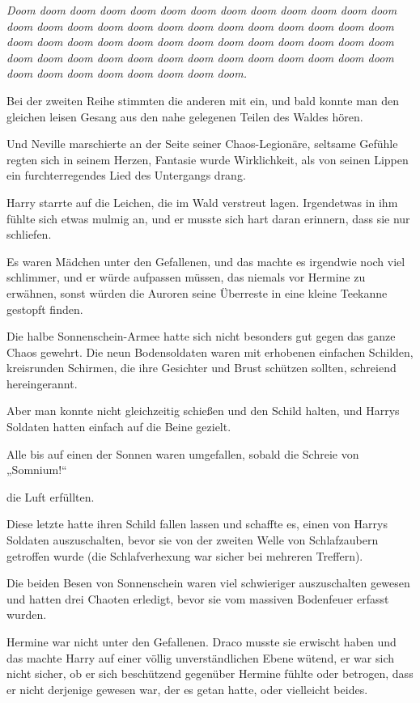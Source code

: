 {\emph{Doom doom doom doom doom doom doom doom doom doom doom doom doom doom doom doom doom doom doom doom doom doom doom doom doom doom doom doom doom doom doom doom doom doom doom doom doom doom doom doom doom doom doom doom doom doom doom doom doom doom doom doom doom doom doom doom doom doom doom doom.}

Bei der zweiten Reihe stimmten die anderen mit ein, und bald konnte man den gleichen leisen Gesang aus den nahe gelegenen Teilen des Waldes hören.

Und Neville marschierte an der Seite seiner Chaos-Legionäre, seltsame Gefühle regten sich in seinem Herzen, Fantasie wurde Wirklichkeit, als von seinen Lippen ein furchterregendes Lied des Untergangs drang.

Harry starrte auf die Leichen, die im Wald verstreut lagen. Irgendetwas in ihm fühlte sich etwas mulmig an, und er musste sich hart daran erinnern, dass sie nur schliefen.

Es waren Mädchen unter den Gefallenen, und das machte es irgendwie noch viel schlimmer, und er würde aufpassen müssen, das niemals vor Hermine zu erwähnen, sonst würden die Auroren seine Überreste in eine kleine Teekanne gestopft finden.

Die halbe Sonnenschein-Armee hatte sich nicht besonders gut gegen das ganze Chaos gewehrt. Die neun Bodensoldaten waren mit erhobenen einfachen Schilden, kreisrunden Schirmen, die ihre Gesichter und Brust schützen sollten, schreiend hereingerannt.

Aber man konnte nicht gleichzeitig schießen und den Schild halten, und Harrys Soldaten hatten einfach auf die Beine gezielt.

Alle bis auf einen der Sonnen waren umgefallen, sobald die Schreie von „Somnium!“

die Luft erfüllten.

Diese letzte hatte ihren Schild fallen lassen und schaffte es, einen von Harrys Soldaten auszuschalten, bevor sie von der zweiten Welle von Schlafzaubern getroffen wurde (die Schlafverhexung war sicher bei mehreren Treffern).

Die beiden Besen von Sonnenschein waren viel schwieriger auszuschalten gewesen und hatten drei Chaoten erledigt, bevor sie vom massiven Bodenfeuer erfasst wurden.

Hermine war nicht unter den Gefallenen. Draco musste sie erwischt haben und das machte Harry auf einer völlig unverständlichen Ebene wütend, er war sich nicht sicher, ob er sich beschützend gegenüber Hermine fühlte oder betrogen, dass er nicht derjenige gewesen war, der es getan hatte, oder vielleicht beides.

}
